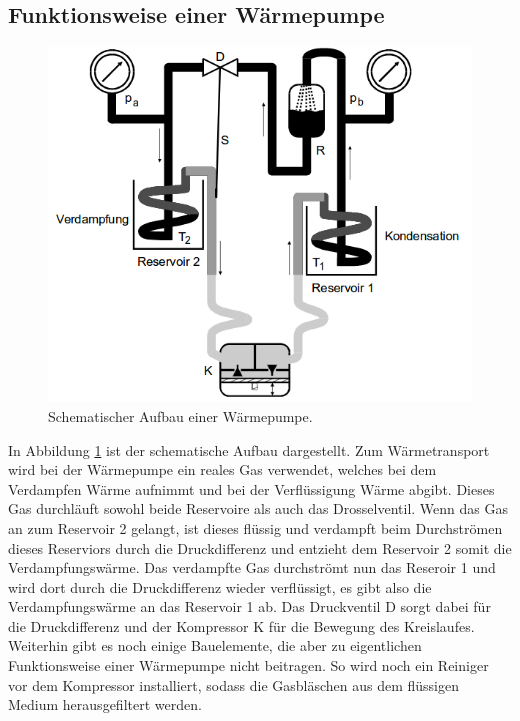 \subsection{Funktionsweise einer Wärmepumpe}

\begin{figure}
  \centering
  \includegraphics[scale = 0.4]{SchematischerAufbau.png}
  \caption{Schematischer Aufbau einer Wärmepumpe. \cite{Quelle}}
  \label{Abb:1}
\end{figure}

In Abbildung \ref{Abb:1} ist der schematische Aufbau dargestellt.
Zum Wärmetransport wird bei der Wärmepumpe ein reales Gas verwendet, welches bei dem Verdampfen Wärme aufnimmt und bei der Verflüssigung
Wärme abgibt. Dieses Gas durchläuft sowohl beide Reservoire als auch das Drosselventil.
Wenn das Gas an zum Reservoir 2 gelangt, ist dieses flüssig und verdampft beim Durchströmen dieses Reserviors durch die Druckdifferenz und
entzieht dem Reservoir 2 somit die Verdampfungswärme. Das verdampfte Gas durchströmt nun das Reseroir 1 und wird dort durch die Druckdifferenz wieder verflüssigt,
es gibt also die Verdampfungswärme an das Reservoir 1 ab. Das Druckventil D sorgt dabei für die Druckdifferenz und der Kompressor K für die
Bewegung des Kreislaufes.
Weiterhin gibt es noch einige Bauelemente, die aber zu eigentlichen Funktionsweise einer Wärmepumpe nicht beitragen. So wird noch ein Reiniger vor
dem Kompressor installiert, sodass die Gasbläschen aus dem flüssigen Medium herausgefiltert werden.

